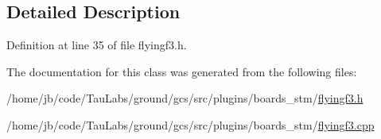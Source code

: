 \subsection{\-Detailed \-Description}


\-Definition at line 35 of file flyingf3.\-h.



\-The documentation for this class was generated from the following files\-:\begin{DoxyCompactItemize}
\item 
/home/jb/code/\-Tau\-Labs/ground/gcs/src/plugins/boards\-\_\-stm/\hyperlink{flyingf3_8h}{flyingf3.\-h}\item 
/home/jb/code/\-Tau\-Labs/ground/gcs/src/plugins/boards\-\_\-stm/\hyperlink{flyingf3_8cpp}{flyingf3.\-cpp}\end{DoxyCompactItemize}

